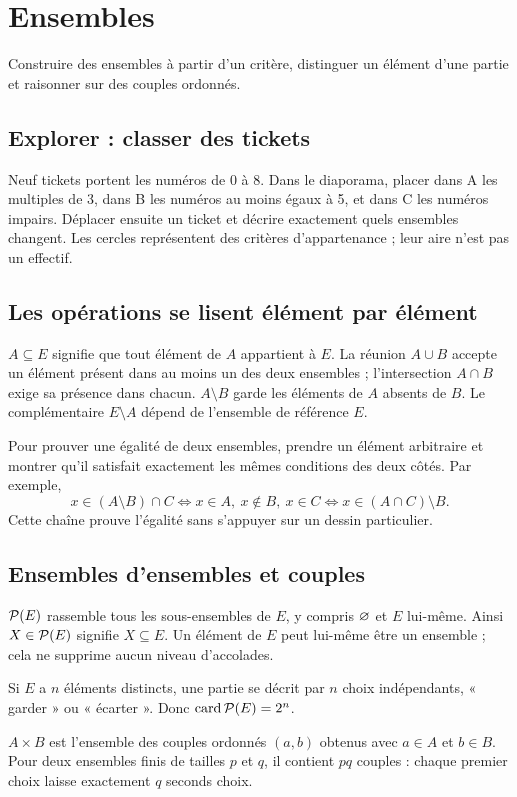 \clearpage
\section{Ensembles}
\begin{objectif}
Construire des ensembles à partir d'un critère, distinguer un élément d'une partie et raisonner sur des couples ordonnés.
\end{objectif}
\subsection{Explorer : classer des tickets}
Neuf tickets portent les numéros de $0$ à $8$. Dans le diaporama, placer dans A les multiples de 3, dans B les numéros au moins égaux à 5, et dans C les numéros impairs. Déplacer ensuite un ticket et décrire exactement quels ensembles changent. Les cercles représentent des critères d'appartenance ; leur aire n'est pas un effectif.
\subsection{Les opérations se lisent élément par élément}
\begin{definition}
$A\subseteq E$ signifie que tout élément de $A$ appartient à $E$. La réunion $A\cup B$ accepte un élément présent dans au moins un des deux ensembles ; l'intersection $A\cap B$ exige sa présence dans chacun. $A\setminus B$ garde les éléments de $A$ absents de $B$. Le complémentaire $E\setminus A$ dépend de l'ensemble de référence $E$.
\end{definition}
Pour prouver une égalité de deux ensembles, prendre un élément arbitraire et montrer qu'il satisfait exactement les mêmes conditions des deux côtés. Par exemple,
\[x\in(A\setminus B)\cap C\iff x\in A,\ x\notin B,\ x\in C\iff x\in(A\cap C)\setminus B.\]
Cette chaîne prouve l'égalité sans s'appuyer sur un dessin particulier.
\subsection{Ensembles d'ensembles et couples}
\begin{definition}
$\mathcal{P}(E)$ rassemble tous les sous-ensembles de $E$, y compris $\varnothing$ et $E$ lui-même. Ainsi $X\in\mathcal{P}(E)$ signifie $X\subseteq E$. Un élément de $E$ peut lui-même être un ensemble ; cela ne supprime aucun niveau d'accolades.
\end{definition}
Si $E$ a $n$ éléments distincts, une partie se décrit par $n$ choix indépendants, « garder » ou « écarter ». Donc $\operatorname{card}\mathcal{P}(E)=2^n$.
\begin{definition}
$A\times B$ est l'ensemble des couples ordonnés $(a,b)$ obtenus avec $a\in A$ et $b\in B$. Pour deux ensembles finis de tailles $p$ et $q$, il contient $pq$ couples : chaque premier choix laisse exactement $q$ seconds choix.
\end{definition}
